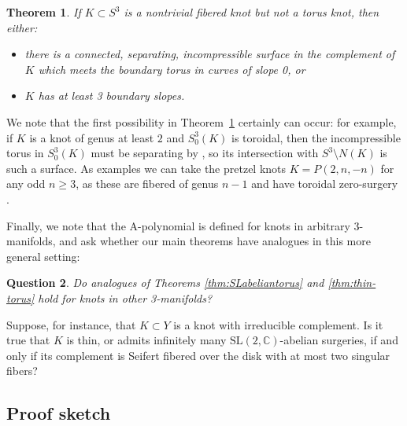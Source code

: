 \documentclass[11pt]{amsart}
\newtheorem {theorem}{Theorem}
\newtheorem {question}[theorem]{Question}
\numberwithin{equation}{section}
\numberwithin{theorem}{section}
\theoremstyle{definition}
\newcommand{\C}{\mathbb{C}}
\newcommand\SL{\mathrm{SL}}
\begin{document}
\begin{theorem}
\label{thm:slopes}
If $K\subset S^3$ is a nontrivial fibered knot but not a torus knot, then either:
\begin{itemize}
\item there is a connected, separating, incompressible surface in the complement of $K$ which meets the boundary torus in curves of slope 0, or
\item $K$ has at least 3 boundary slopes.
\end{itemize}
\end{theorem}
We note that the first possibility in Theorem~\ref{thm:slopes} certainly can occur: for example, if $K$ is a knot of genus at least $2$ and $S^3_0(K)$ is toroidal, then the incompressible torus in $S^3_0(K)$ must be separating by \cite[Corollary~8.3]{gabai-foliations3}, so its intersection with $S^3 \setminus N(K)$ is such a surface.  As examples we can take the pretzel knots $K = P(2,n,-n)$ for any odd $n\geq 3$, as these are fibered of genus $n-1$ \cite[Theorem~6.7, Case~2B]{gabai-fibred} and have toroidal zero-surgery \cite[Theorem~1.1(2)]{wu}.

Finally, we note that the A-polynomial is defined for knots in arbitrary 3-manifolds, and ask whether our main theorems have analogues in this more general setting:

\begin{question}
Do analogues of Theorems \ref{thm:SLabeliantorus} and  \ref{thm:thin-torus} hold for knots in other 3-manifolds?
\end{question}

Suppose, for instance, that  $K\subset Y$ is a knot with irreducible complement.  Is it true that $K$ is thin, or admits infinitely many $\SL(2,\C)$-abelian surgeries, if and only if its complement is Seifert fibered over the disk with at most two singular fibers?

\subsection{Proof sketch}
\end{document}
